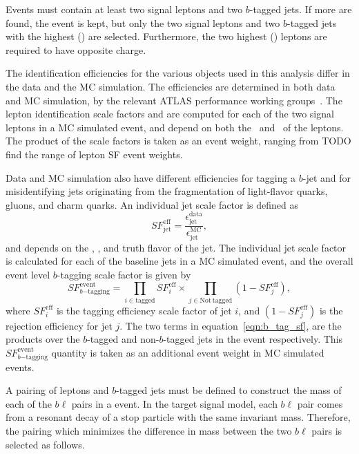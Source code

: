 Events must contain at least two signal leptons and two $b$-tagged jets.
If more are found, the event is kept, but only the two signal leptons and two
$b$-tagged jets with the highest \ET(\pt) are selected.
Furthermore, the two highest \ET(\pt) leptons are required to have opposite charge.

The identification efficiencies for the various objects used in this analysis
differ in the data and the MC simulation.
The efficiencies are determined in both data and MC simulation, by the relevant
ATLAS performance working groups~\cite{egamma2014,Aad:2014rra}.
The lepton identification scale factors and are computed for each of the two
signal leptons in a MC simulated event, and depend on both the
\pt\ and \eta\ of the leptons.
The product of the scale factors is taken as an event weight, ranging from
{\color{red} TODO find the range of lepton SF event weights}.

Data and MC simulation also have different efficiencies for tagging a $b$-jet
and for misidentifying jets originating from the fragmentation of light-flavor
quarks, gluons, and charm quarks. 
An individual jet scale factor is defined as
\begin{equation}
  SF_\mathrm{jet}^\mathrm{eff}
  =
  \frac{\epsilon_\mathrm{jet}^\mathrm{data}}{\epsilon_\mathrm{jet}^\mathrm{MC}},
\end{equation}
and depends on the \et, \eta, and truth flavor of the jet.
The individual jet scale factor is calculated for each of the baseline jets in
a MC simulated event, and the overall event level $b$-tagging scale factor is
given by 
\begin{equation}
  \label{eqn:b_tag_sf}
  SF_{b\mathrm{-tagging}}^\mathrm{event} =
  \prod_{i \in \mathrm{tagged}}
  SF_i^\mathrm{eff}
  \times
  \prod_{j \in \mathrm{Not~tagged}}
  (1- SF_j^\mathrm{eff}),
\end{equation}
where $SF_i^\mathrm{eff}$ is the tagging efficiency scale factor of jet $i$, and
$(1- SF_j^\mathrm{eff})$ is the rejection efficiency for jet $j$.
The two terms in equation~\ref{eqn:b_tag_sf}, are the products over the
$b$-tagged and non-$b$-tagged jets in the event respectively.
This $SF_{b\mathrm{-tagging}}^\mathrm{event}$ quantity is taken as an additional
event weight in MC simulated events.

A pairing of leptons and $b$-tagged jets must be defined to construct the mass
of each of the $b\ell$ pairs in a event.
In the target signal model, each $b\ell$ pair comes from a resonant decay of a
stop particle with the same invariant mass.
Therefore, the pairing which minimizes the difference in mass between the two
$b\ell$ pairs is selected as follows.

